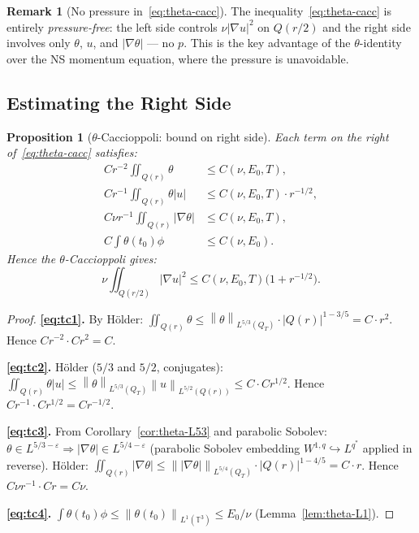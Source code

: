 \documentclass[11pt]{article}
\newtheorem{proposition}[theorem]{Proposition}
\theoremstyle{definition}
\newtheorem{remark}[theorem]{Remark}
\theoremstyle{remark}
\newcommand{\T}{\mathbb{T}}
\newcommand{\norm}[1]{\left\|#1\right\|}
\newcommand{\grad}{\nabla}
\begin{document}
\begin{remark}[No pressure in~\eqref{eq:theta-cacc}]
  The inequality~\eqref{eq:theta-cacc} is entirely \emph{pressure-free}:
  the left side controls $\nu|\grad u|^2$ on $Q(r/2)$ and the right side
  involves only $\theta$, $u$, and $|\grad\theta|$ --- no $p$.
  This is the key advantage of the $\theta$-identity over the NS momentum
  equation, where the pressure is unavoidable.
\end{remark}

\subsection{Estimating the Right Side}

\begin{proposition}[$\theta$-Caccioppoli: bound on right side]\label{prop:theta-cacc-rhs}
  Each term on the right of~\eqref{eq:theta-cacc} satisfies:
  \begin{align}
    Cr^{-2}\iint_{Q(r)}\theta
      &\leq C(\nu,E_0,T),\label{eq:tc1}\\
    Cr^{-1}\iint_{Q(r)}\theta|u|
      &\leq C(\nu,E_0,T)\cdot r^{-1/2},\label{eq:tc2}\\
    C\nu r^{-1}\iint_{Q(r)}|\grad\theta|
      &\leq C(\nu,E_0,T),\label{eq:tc3}\\
    C\int\theta(t_0)\phi
      &\leq C(\nu,E_0).\label{eq:tc4}
  \end{align}
  Hence the $\theta$-Caccioppoli gives:
  \begin{equation}\label{eq:theta-cacc-bound}
    \nu\iint_{Q(r/2)}|\grad u|^2
    \leq C(\nu,E_0,T)\bigl(1 + r^{-1/2}\bigr).
  \end{equation}
\end{proposition}

\begin{proof}
  \textbf{\eqref{eq:tc1}.}
  By H\"older: $\iint_{Q(r)}\theta
  \leq\norm{\theta}_{L^{5/3}(Q_T)}\cdot|Q(r)|^{1-3/5}
  = C\cdot r^2$. Hence $Cr^{-2}\cdot Cr^2 = C$. \checkmark

  \textbf{\eqref{eq:tc2}.}
  H\"older ($5/3$ and $5/2$, conjugates):
  $\iint_{Q(r)}\theta|u|\leq\norm{\theta}_{L^{5/3}(Q_T)}\norm{u}_{L^{5/2}(Q(r))}
  \leq C\cdot Cr^{1/2}$.
  Hence $Cr^{-1}\cdot Cr^{1/2}=Cr^{-1/2}$. \checkmark

  \textbf{\eqref{eq:tc3}.}
  From Corollary~\ref{cor:theta-L53} and parabolic Sobolev:
  $\theta\in L^{5/3-\varepsilon}\Rightarrow|\grad\theta|\in L^{5/4-\varepsilon}$
  (parabolic Sobolev embedding $W^{1,q}\hookrightarrow L^{q^*}$ applied in
  reverse).  H\"older:
  $\iint_{Q(r)}|\grad\theta|\leq\norm{|\grad\theta|}_{L^{5/4}(Q_T)}\cdot|Q(r)|^{1-4/5}
  = C\cdot r$.
  Hence $C\nu r^{-1}\cdot Cr = C\nu$. \checkmark

  \textbf{\eqref{eq:tc4}.}
  $\int\theta(t_0)\phi\leq\norm{\theta(t_0)}_{L^1(\T^3)}\leq E_0/\nu$
  (Lemma~\ref{lem:theta-L1}). \checkmark
\end{proof}
\end{document}
